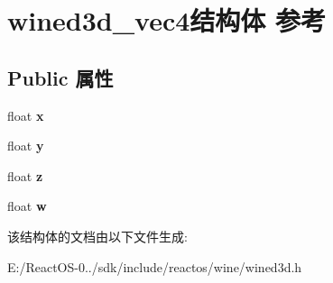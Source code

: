 \hypertarget{structwined3d__vec4}{}\section{wined3d\+\_\+vec4结构体 参考}
\label{structwined3d__vec4}
\subsection*{Public 属性}
\begin{DoxyCompactItemize}
\item 
\mbox{\label{structwined3d__vec4_a4b70b358da1588e204dd7ad3e29f0313}} 
float {\bfseries x}
\item 
\mbox{\label{structwined3d__vec4_a15d1671f72505ae4dc5a9dfa481991cb}} 
float {\bfseries y}
\item 
\mbox{\label{structwined3d__vec4_a7713716da8b5fc54a9acb16281479533}} 
float {\bfseries z}
\item 
\mbox{\label{structwined3d__vec4_a2b75a5ab49362b8dd64c4667ab77c7dc}} 
float {\bfseries w}
\end{DoxyCompactItemize}


该结构体的文档由以下文件生成\+:\begin{DoxyCompactItemize}
\item 
E\+:/\+React\+O\+S-\/0../sdk/include/reactos/wine/wined3d.\+h\end{DoxyCompactItemize}

